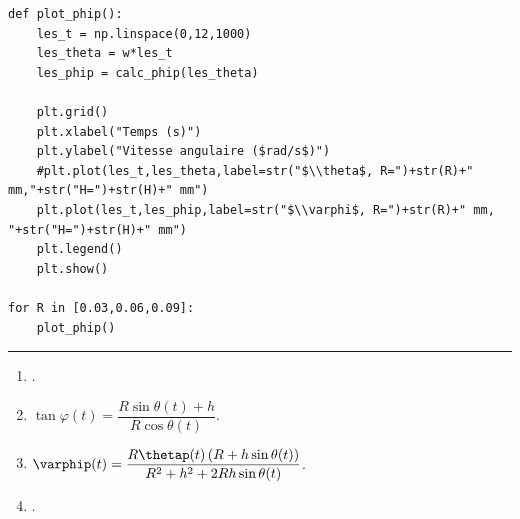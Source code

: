 \begin{corrigebox}
\begin{lstlisting}
def plot_phip():
    les_t = np.linspace(0,12,1000)
    les_theta = w*les_t
    les_phip = calc_phip(les_theta)
    
    plt.grid()
    plt.xlabel("Temps (s)")
    plt.ylabel("Vitesse angulaire ($rad/s$)")
    #plt.plot(les_t,les_theta,label=str("$\\theta$, R=")+str(R)+" mm,"+str("H=")+str(H)+" mm")
    plt.plot(les_t,les_phip,label=str("$\\varphi$, R=")+str(R)+" mm, "+str("H=")+str(H)+" mm")
    plt.legend()
    plt.show()

for R in [0.03,0.06,0.09]:
    plot_phip()
\end{lstlisting}
\noindent\hrule

\begin{enumerate}
\item .
\item $\tan\varphi(t)=\dfrac{R\sin\theta(t)+h}{R \cos\theta(t)}$.
\item $ \varphip(t) =  \dfrac{R \thetap(t)\left(R+h\sin\theta(t)\right)}{R^2+h^2+2 Rh\sin\theta(t)}$.
\item .
\end{enumerate}
\end{corrigebox}
